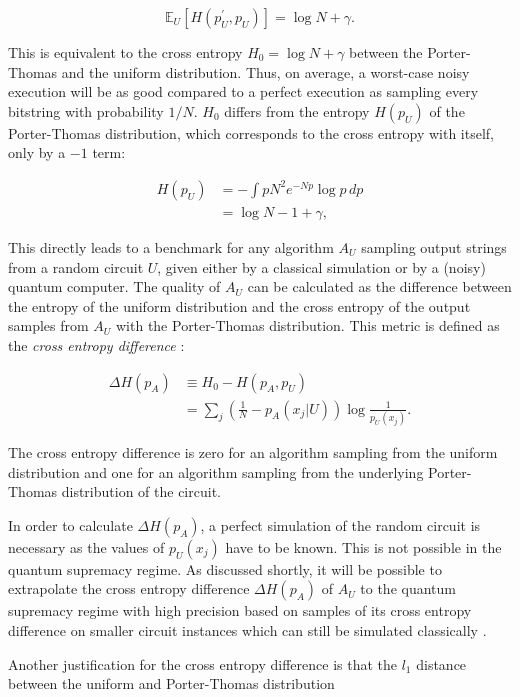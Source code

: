 \begin{equation}
  \mathbb{E}_U [H(p_U^{\prime},p_U)] = \log{N} + \gamma.
\end{equation}

This is equivalent to the cross entropy $H_0 = \log{N} + \gamma$ between the
Porter-Thomas and the uniform distribution. Thus, on
average, a worst-case noisy execution will be as good compared to a perfect execution as sampling
every bitstring with probability $1/N$. $H_0$ differs from the entropy $H(p_U)$ of
the Porter-Thomas distribution, which corresponds to the cross entropy with
itself, only by a $-1$ term:

\begin{align}
  H(p_U) &= - \int p N^2e^{-Np}\log{p} \, dp \\
         &= \log{N} -1 + \gamma,
\end{align}

This directly leads to a benchmark for any algorithm $A_U$ sampling output strings from a
random circuit $U$, given either by a
classical simulation or by a (noisy) quantum computer. The quality of 
$A_U$ can be calculated as the difference between
the entropy of the uniform distribution and the cross entropy of the output
samples from $A_U$ with the Porter-Thomas distribution. This metric is
defined as the \textit{cross entropy difference} \cite{Boixo2018supremacy}:

\begin{align}
  \Delta H(p_A) &\equiv H_0 - H(p_A, p_U) \\
                 &=\sum_j \left(\frac{1}{N} - p_A(x_j|U)\right)\log{\frac{1}{p_U(x_j)}}.
\end{align}

The cross entropy difference is zero for an algorithm sampling from the uniform
distribution and one for an algorithm sampling from the underlying Porter-Thomas
distribution of the circuit.

In order to calculate $\Delta H(p_A)$, 
a perfect simulation of the random circuit is necessary as the values of $p_U(x_j)$ have to be known. This is not possible in the quantum
supremacy regime. As discussed shortly, it will be possible
to extrapolate the cross entropy difference $\Delta H(p_A)$ of $A_U$ to the quantum supremacy regime with high
precision based on samples of its cross entropy difference on smaller circuit
instances which can still be simulated classically \cite{Boixo2018supremacy}.

Another justification for the cross entropy difference is that the $l_1$ distance between the uniform and Porter-Thomas distribution

